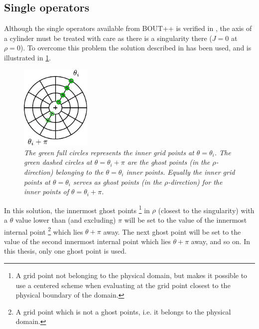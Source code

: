 \subsection{Single operators}
%
Although the single operators available from BOUT++ is verified in \cite{Dudson2016}, the axis of a cylinder must be treated with care as there is a singularity there ($J=0$ at $\rho=0$).
To overcome this problem the solution described in \cite{Naulin2008} has been used, and is illustrated in \cref{fig:innerRho}.
%
\begin{figure}[htb]
    \centering
    \includegraphics[width=0.3\textwidth]{fig/innerGhost}
    \caption{\textit{
        The green full circles represents the inner grid points at
        $\theta=\theta_i$. The green dashed circles at $\theta=\theta_i + \pi$
        are the ghost points (in the $\rho$-direction) belonging to the
        $\theta=\theta_i$ inner points. Equally the inner grid points at
        $\theta=\theta_i$ serves as ghost points (in the $\rho$-direction) for
        the inner points of $\theta=\theta_i + \pi$.
    }}
    \label{fig:innerRho}
\end{figure}
%
In this solution, the innermost ghost points%
\footnote{A grid point not belonging to the physical domain, but makes it possible to use a centered scheme when evaluating at the grid point closest to the physical boundary of the domain.}
in $\rho$ (closest to the singularity) with a $\theta$ value lower than (and excluding) $\pi$ will be set to the value of the innermost internal point%
\footnote{A grid point which is not a ghost points, i.e. it belongs to the physical domain.}%
%
which lies $\theta + \pi$ away.
The next ghost point will be set to the value of the second innermost internal point which lies $\theta + \pi$ away, and so on.
In this thesis, only one ghost point is used.

